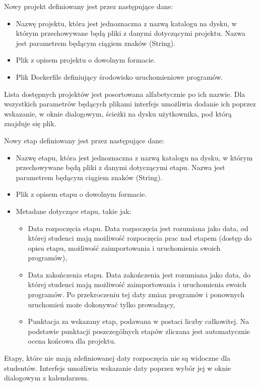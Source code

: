 Nowy projekt definiowany jest przez następujące dane:
\begin {itemize}
    \item Nazwę projektu, która jest jednoznaczna z nazwą katalogu na dysku, w którym przechowywane będą pliki z danymi dotyczącymi projektu.
    Nazwa jest parametrem będącym ciągiem znaków (String).
    \item Plik z opisem projektu o dowolnym formacie.
    \item Plik Dockerfile definiujący środowisko uruchomieniowe programów.
\end {itemize}

Lista dostępnych projektów jest posortowana alfabetycznie po ich nazwie.
Dla wszystkich parametrów będących plikami interfejs umożliwia dodanie ich poprzez wskazanie, w oknie dialogowym, ścieżki na dysku użytkownika, pod którą znajduje się plik.

Nowy etap definiowany jest przez następujące dane:
\begin {itemize}
    \item Nazwę etapu, która jest jednoznaczna z nazwą katalogu na dysku, w którym przechowywane będą pliki z danymi dotyczącymi etapu.
    Nazwa jest parametrem będącym ciągiem znaków (String).
    \item Plik z opisem etapu o dowolnym formacie.
    \item Metadane dotyczące etapu, takie jak:
    \begin {itemize}
        \item Data rozpoczęcia etapu.
        Data rozpoczęcia jest rozumiana jako data, od której studenci mają możliwość rozpoczęcia prac nad etapem (dostęp do opisu etapu, możliwość zaimportowania i uruchomienia swoich programów),
        \item Data zakończenia etapu.
        Data zakończenia jest rozumiana jako data, do której studenci mają możliwość zaimportowania i uruchomienia swoich programów.
        Po przekroczeniu tej daty zmian programów i ponownych uruchomień może dokonywać tylko prowadzący,
        \item Punktacja za wskazany etap, podawana w postaci liczby całkowitej.
        Na podstawie punktacji poszczególnych etapów zliczana jest automatycznie ocena końcowa dla projektu.
    \end{itemize}
\end {itemize}

Etapy, które nie mają zdefiniowanej daty rozpoczęcia nie są widoczne dla studentów.
Interfejs umożliwia wskazanie daty poprzez wybór jej w oknie dialogowym z kalendarzem.

